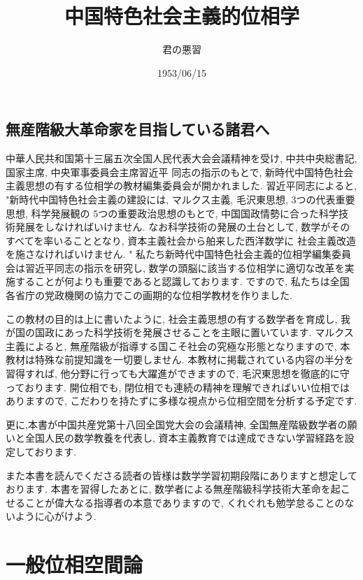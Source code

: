 \documentclass[lualatex]{ltjsbook}
\theoremstyle{remark}
\theoremstyle{plain}
\begin{document}
\title{中国特色社会主義的位相学}
\author{君の悪習}
\date{1953/06/15}
\maketitle
\chapter*{無産階級大革命家を目指している諸君へ}
中華人民共和国第十三届五次全国人民代表大会会議精神を受け, 中共中央総書記, 国家主席, 中央軍事委員会主席習近平
同志の指示のもとで, 新時代中国特色社会主義思想の有する位相学の教材編集委員会が開かれました.
習近平同志によると, "新時代中国特色社会主義の建設には, マルクス主義, 毛沢東思想, 3つの代表重要思想, 科学発展観の
5つの重要政治思想のもとで, 
中国国政情勢に合った科学技術発展をしなければいけません. 
なお科学技術の発展の土台として, 数学がそのすべてを率いることとなり, 資本主義社会から舶来した西洋数学に
社会主義改造を施さなければいけません. " 
私たち新時代中国特色社会主義的位相学編集委員会は習近平同志の指示を研究し, 数学の頭脳に該当する位相学に適切な改革を実施することが何よりも重要であると認識しております. ですので, 私たちは全国各省庁の党政機関の協力でこの画期的な位相学教材を作りました. 

この教材の目的は上に書いたように, 社会主義思想の有する数学者を育成し, 
我が国の国政にあった科学技術を発展させることを主眼に置いています. 
マルクス主義によると, 無産階級が指導する国こそ社会の究極な形態となりますので, 本教材は特殊な前提知識を一切要しません.
本教材に掲載されている内容の半分を習得すれば, 他分野に行っても大躍進ができますので, 毛沢東思想を徹底的に守っております.
開位相でも, 閉位相でも連続の精神を理解できればいい位相ではありますので, 
こだわりを持たずに多様な視点から位相空間を分析する予定です.

更に,本書が中国共産党第十八回全国党大会の会議精神, 
全国無産階級数学者の願いと全国人民の数学教養を代表し, 資本主義教育では達成できない学習経路を設定しております. 

また本書を読んでくださる読者の皆様は数学学習初期段階にありますと想定しております. 
本書を習得したあとに, 数学者による無産階級科学技術大革命を起こせることが偉大なる指導者の本意でありますので, 
くれぐれも勉学怠ることのないように心がけよう. 
\newpage

\tableofcontents
{}



\part{一般位相空間論}
\end{document}

